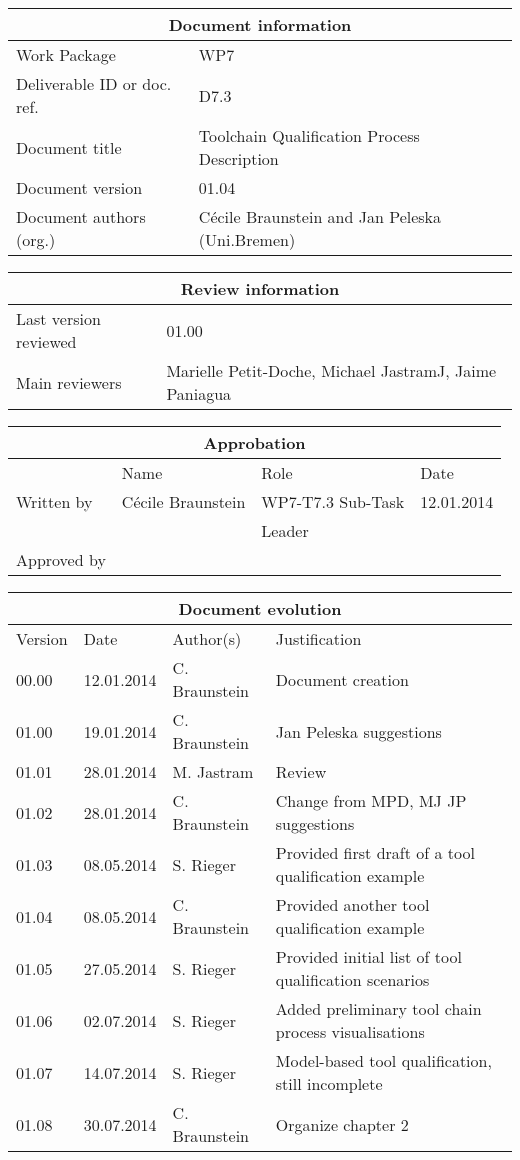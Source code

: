 \documentclass{openetcs_report}
\begin{document}
\begin{tabular}{|p{4.4cm}|p{8.7cm}|}
\hline
\multicolumn{2}{|c|}{Document information} \\
\hline
Work Package &  WP7  \\
Deliverable ID or doc. ref. & D7.3\\
\hline
Document title & Toolchain Qualification Process Description \\
Document version & 01.04 \\
Document authors (org.)  & Cécile Braunstein and Jan Peleska (Uni.Bremen) \\
\hline
\end{tabular}

\begin{tabular}{|p{4.4cm}|p{8.7cm}|}
\hline
\multicolumn{2}{|c|}{Review information} \\
\hline
Last version reviewed & 01.00 \\
\hline
Main reviewers &  Marielle Petit-Doche, Michael JastramJ, Jaime Paniagua\\
\hline
\end{tabular}

\begin{tabular}{|p{2.2cm}|p{4cm}|p{4cm}|p{2cm}|}
\hline
\multicolumn{4}{|c|}{Approbation} \\
\hline
  &  Name & Role & Date   \\
\hline  
Written by    &  Cécile Braunstein & WP7-T7.3 Sub-Task  & 12.01.2014 \\
&  & Leader&\\
\hline
Approved by &  &   &  \\
\hline
\end{tabular}

\begin{tabular}{|p{2.2cm}|p{2cm}|p{3cm}|p{5cm}|}
\hline
\multicolumn{4}{|c|}{Document evolution} \\
\hline
Version &  Date & Author(s) & Justification  \\
\hline  
00.00 & 12.01.2014 & C. Braunstein  &  Document creation  \\
01.00 & 19.01.2014 & C. Braunstein  &  Jan Peleska suggestions \\
01.01 & 28.01.2014 & M. Jastram  &  Review \\
01.02 & 28.01.2014 &  C. Braunstein &  Change from MPD, MJ JP suggestions \\
01.03 & 08.05.2014 &  S. Rieger &  Provided first draft of a tool qualification example \\
01.04 & 08.05.2014 &  C. Braunstein  &  Provided  another  tool qualification example \\
01.05 & 27.05.2014 &  S. Rieger &  Provided initial list of tool qualification scenarios\\
01.06 & 02.07.2014 &  S. Rieger &  Added preliminary tool chain process visualisations\\
01.07 & 14.07.2014 &  S. Rieger &  Model-based tool qualification,
still incomplete\\
01.08 & 30.07.2014 & C. Braunstein & Organize chapter 2 \\
\hline  
\end{tabular}
\newpage
\end{document}
